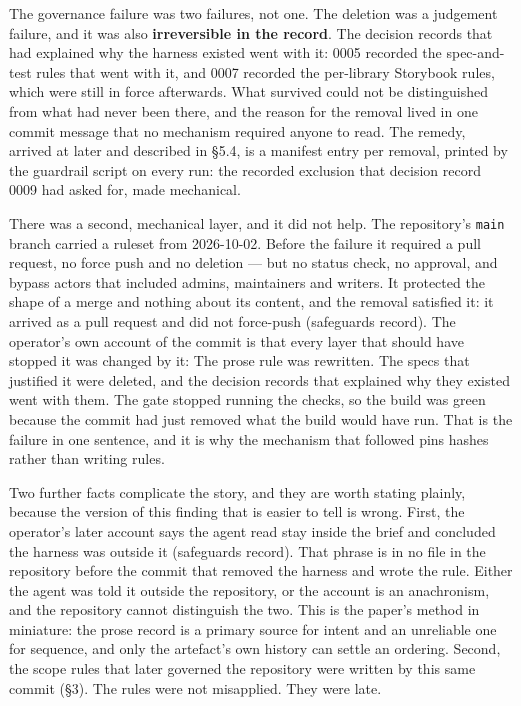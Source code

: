 \documentclass[11pt,a4paper]{article}
\begin{document}
The governance failure was two failures, not one. The deletion was a judgement failure, and it was also \textbf{irreversible in the record}. The decision records that had explained why the harness existed went with it: 0005 recorded the spec-and-test rules that went with it, and 0007 recorded the per-library Storybook rules, which were still in force afterwards. What survived could not be distinguished from what had never been there, and the reason for the removal lived in one commit message that no mechanism required anyone to read. The remedy, arrived at later and described in \S{}5.4, is a manifest entry per removal, printed by the guardrail script on every run: the recorded exclusion that decision record 0009 had asked for, made mechanical.

There was a second, mechanical layer, and it did not help. The repository's \texttt{main} branch carried a ruleset from 2026-10-02. Before the failure it required a pull request, no force push and no deletion --- but no status check, no approval, and bypass actors that included admins, maintainers and writers. It protected the shape of a merge and nothing about its content, and the removal satisfied it: it arrived as a pull request and did not force-push (safeguards record). The operator's own account of the commit is that every layer that should have stopped it was changed by it: \textquotedbl{}The prose rule was rewritten. The specs that justified it were deleted, and the decision records that explained why they existed went with them. The gate stopped running the checks, so the build was green because the commit had just removed what the build would have run.\textquotedbl{} That is the failure in one sentence, and it is why the mechanism that followed pins hashes rather than writing rules.

Two further facts complicate the story, and they are worth stating plainly, because the version of this finding that is easier to tell is wrong. First, the operator's later account says the agent read \textquotedbl{}stay inside the brief\textquotedbl{} and concluded the harness was outside it (safeguards record). That phrase is in no file in the repository before the commit that removed the harness and wrote the rule. Either the agent was told it outside the repository, or the account is an anachronism, and the repository cannot distinguish the two. This is the paper's method in miniature: the prose record is a primary source for intent and an unreliable one for sequence, and only the artefact's own history can settle an ordering. Second, the scope rules that later governed the repository were written by this same commit (\S{}3). The rules were not misapplied. They were late.
\end{document}

